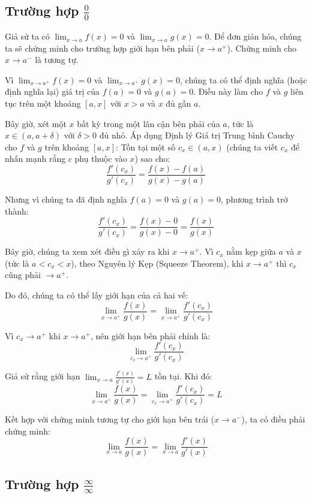 \subsection{\texorpdfstring{Trường hợp $\frac{0}{0}$}{Trường hợp 0/0}}

Giả sử ta có $\lim_{x \to a} f(x) = 0$ và $\lim_{x \to a} g(x) = 0$.
Để đơn giản hóa, chúng ta sẽ chứng minh cho trường hợp giới hạn bên phải ($x \to a^+$). Chứng minh cho $x \to a^-$ là tương tự.

Vì $\lim_{x \to a^+} f(x) = 0$ và $\lim_{x \to a^+} g(x) = 0$, chúng ta có thể định nghĩa (hoặc định nghĩa lại) giá trị của $f(a) = 0$ và $g(a) = 0$. Điều này làm cho $f$ và $g$ liên tục trên một khoảng $[a, x]$ với $x > a$ và $x$ đủ gần $a$.

Bây giờ, xét một $x$ bất kỳ trong một lân cận bên phải của $a$, tức là $x \in (a, a+\delta)$ với $\delta > 0$ đủ nhỏ.
Áp dụng Định lý Giá trị Trung bình Cauchy cho $f$ và $g$ trên khoảng $[a, x]$:
Tồn tại một số $c_x \in (a, x)$ (chúng ta viết $c_x$ để nhấn mạnh rằng $c$ phụ thuộc vào $x$) sao cho:
$$ \frac{f'(c_x)}{g'(c_x)} = \frac{f(x) - f(a)}{g(x) - g(a)} $$

Nhưng vì chúng ta đã định nghĩa $f(a) = 0$ và $g(a) = 0$, phương trình trở thành:
$$ \frac{f'(c_x)}{g'(c_x)} = \frac{f(x) - 0}{g(x) - 0} = \frac{f(x)}{g(x)} $$

Bây giờ, chúng ta xem xét điều gì xảy ra khi $x \to a^+$.
Vì $c_x$ nằm kẹp giữa $a$ và $x$ (tức là $a < c_x < x$), theo Nguyên lý Kẹp (Squeeze Theorem), khi $x \to a^+$ thì $c_x$ cũng phải $\to a^+$.

Do đó, chúng ta có thể lấy giới hạn của cả hai vế:
$$ \lim_{x \to a^+} \frac{f(x)}{g(x)} = \lim_{x \to a^+} \frac{f'(c_x)}{g'(c_x)} $$

Vì $c_x \to a^+$ khi $x \to a^+$, nên giới hạn bên phải chính là:
$$ \lim_{c_x \to a^+} \frac{f'(c_x)}{g'(c_x)} $$

Giả sử rằng giới hạn $\lim_{x \to a} \frac{f'(x)}{g'(x)} = L$ tồn tại. Khi đó:
$$ \lim_{x \to a^+} \frac{f(x)}{g(x)} = \lim_{c_x \to a^+} \frac{f'(c_x)}{g'(c_x)} = L $$

Kết hợp với chứng minh tương tự cho giới hạn bên trái ($x \to a^-$), ta có điều phải chứng minh:
$$ \lim_{x \to a} \frac{f(x)}{g(x)} = \lim_{x \to a} \frac{f'(x)}{g'(x)} $$

\subsection{\texorpdfstring{Trường hợp $\frac{\infty}{\infty}$}{Trường hợp Vô cực / Vô cực}}

